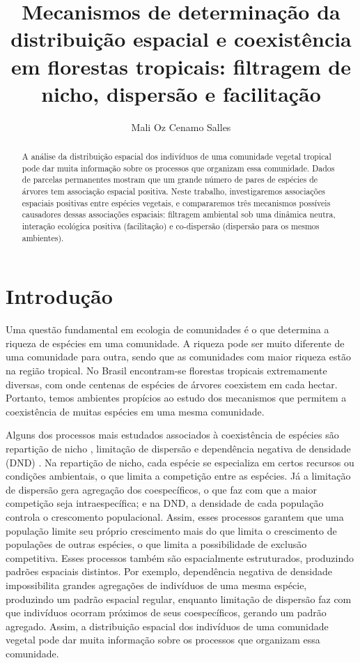 \documentclass[twoside,12pt,a4paper]{report}
\begin{document}
\title{Mecanismos de determinação da distribuição espacial e coexistência em florestas tropicais:
filtragem de nicho, dispersão e facilitação}
\author{Mali Oz Cenamo Salles}


\begin{abstract}

A análise da distribuição espacial dos indivíduos de uma comunidade vegetal tropical pode dar muita
informação sobre os processos que organizam essa comunidade. Dados de parcelas permanentes mostram
que um grande número de pares de espécies de árvores tem associação espacial positiva. Neste
trabalho, investigaremos associações espaciais positivas entre espécies vegetais, e compararemos
três mecanismos possíveis causadores dessas associações espaciais: filtragem ambiental sob uma
dinâmica neutra, interação ecológica positiva (facilitação) e co-dispersão (dispersão para os mesmos
ambientes).

\end{abstract}

\section{Introdução}

Uma questão fundamental em ecologia de comunidades é o que determina a riqueza de
espécies em uma comunidade. 
A riqueza pode ser muito diferente de uma comunidade para outra, sendo que as comunidades com
maior riqueza estão na região tropical.
No Brasil encontram-se florestas tropicais extremamente diversas, com onde centenas de
espécies de árvores coexistem em cada hectar. Portanto, temos ambientes propícios ao estudo dos mecanismos
que permitem a coexistência de muitas espécies em uma mesma comunidade.

Alguns dos processos mais estudados associados à coexistência de espécies são repartição de
nicho \citep{Hutchinson1957}, limitação de dispersão \citep{HurttPacala1995} e dependência
negativa de densidade (DND)
\citep{refs}. 
Na repartição de nicho, cada espécie se especializa em certos recursos ou condições
ambientais, o que limita a competição entre as espécies. Já a limitação de dispersão gera
agregação dos coespecíficos, o que faz com que a maior competição seja intraespecífica; e na
DND, a densidade de cada população controla o crescomento populacional.
Assim, esses processos garantem que uma população limite seu próprio crescimento mais do que limita o
crescimento de populações de outras espécies, o que limita a possibilidade de exclusão
competitiva.
Esses processos também são espacialmente
estruturados, produzindo padrões espaciais distintos. Por exemplo, dependência negativa de
densidade impossibilita grandes agregações de indivíduos de uma mesma espécie,
produzindo um padrão espacial regular, enquanto limitação de dispersão faz com que
indivíduos ocorram próximos de seus coespecíficos, gerando um padrão agregado.
Assim, a distribuição espacial dos indivíduos de uma comunidade vegetal pode dar muita
informação sobre os processos que organizam essa comunidade.  
\end{document}
